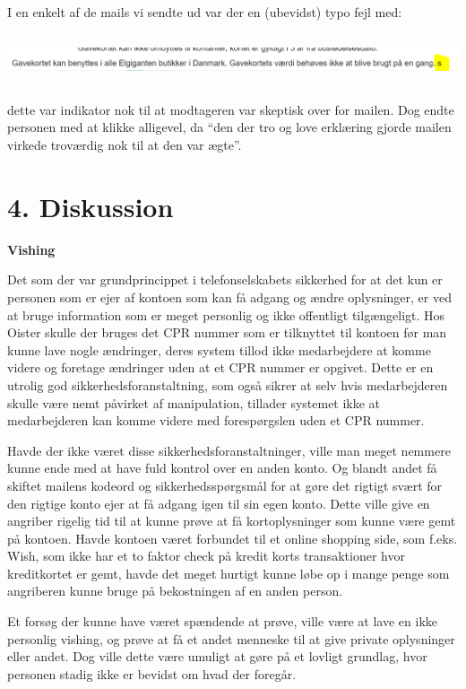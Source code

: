 \documentclass[11pt]{report}
\begin{document}
I en enkelt af de mails vi sendte ud var der en (ubevidst) typo fejl med:
\begin{center}
\includegraphics[height=1.5cm, width=17cm]{typo}
\end{center}
dette var indikator nok til at modtageren var skeptisk over for mailen. Dog endte personen med at klikke alligevel, da “den der tro og love erklæring gjorde mailen virkede troværdig nok til at den var ægte”.
\chapter*{4. Diskussion}
\noindent\textbf{Vishing}
\par Det som der var grundprincippet i telefonselskabets sikkerhed for at det kun er personen som er ejer af kontoen som kan få adgang og ændre oplysninger, er ved at bruge information som er meget personlig og ikke offentligt tilgængeligt. Hos Oister skulle der bruges det CPR nummer som er tilknyttet til kontoen før man kunne lave nogle ændringer, deres system tillod ikke medarbejdere at komme videre og foretage ændringer uden at et CPR nummer er opgivet. Dette er en utrolig god sikkerhedsforanstaltning, som også sikrer at selv hvis medarbejderen skulle være nemt påvirket af manipulation, tillader systemet ikke at medarbejderen kan komme videre med forespørgslen uden et CPR nummer. 

Havde der ikke været disse sikkerhedsforanstaltninger, ville man meget nemmere kunne ende med at have fuld kontrol over en anden konto. Og blandt andet få skiftet mailens kodeord og sikkerhedsspørgsmål for at gøre det rigtigt svært for den rigtige konto ejer at få adgang igen til sin egen konto. Dette ville give en angriber rigelig tid til at kunne prøve at få kortoplysninger som kunne være gemt på kontoen. Havde kontoen været forbundet til et online shopping side, som f.eks. Wish, som ikke har et to faktor check på kredit korts transaktioner hvor kreditkortet er gemt, havde det meget hurtigt kunne løbe op i mange penge som angriberen kunne bruge på bekostningen af en anden person.  

Et forsøg der kunne have været spændende at prøve, ville være at lave en ikke personlig vishing, og prøve at få et andet menneske til at give private oplysninger eller andet. Dog ville dette være umuligt at gøre på et lovligt grundlag, hvor personen stadig ikke er bevidst om hvad der foregår. 
\end{document}

